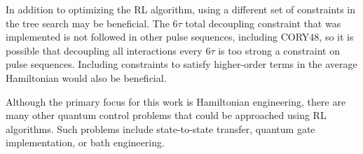 In addition to optimizing the RL algorithm, using a different set of constraints in the tree search may be beneficial. The $6\tau$ total decoupling constraint that was implemented is not followed in other pulse sequences, including CORY48, so it is possible that decoupling all interactions every $6\tau$ is too strong a constraint on pulse sequences. Including constraints to satisfy higher-order terms in the average Hamiltonian would also be beneficial.


Although the primary focus for this work is Hamiltonian engineering, there are many other quantum control problems that could be approached using RL algorithms. Such problems include state-to-state transfer, quantum gate implementation, or bath engineering.
